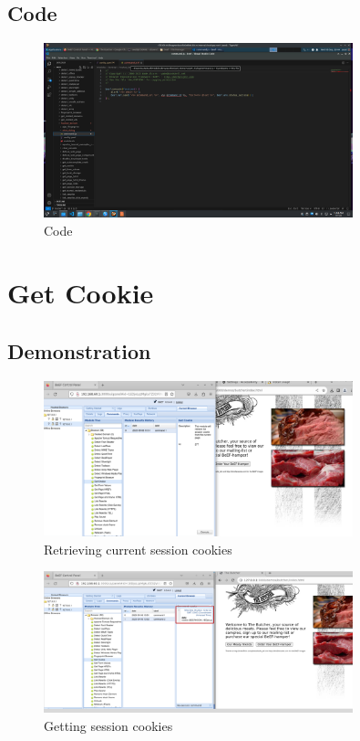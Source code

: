 \documentclass{report}
\begin{document}
\pagebreak

\subsection{Code}
\begin{figure}[!htbp]
    \centering
    \includegraphics[width=0.8\textwidth]{Alert Dialog/code.png}
    \caption{Code}
    \label{fig:ad3}
\end{figure}

\pagebreak


\section{Get Cookie}
\subsection{Demonstration}

\begin{figure}[!htbp]
    \centering
    \includegraphics[width=0.8\textwidth]{Get Cookie/1.png}
    \caption{Retrieving current session cookies}
    \label{fig:gc1}
\end{figure}

\begin{figure}[!htbp]
    \centering
    \includegraphics[width=0.8\textwidth]{Get Cookie/2.png}
    \caption{Getting session cookies}
    \label{fig:gc2}
\end{figure}
\end{document}

